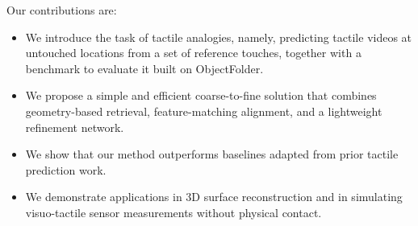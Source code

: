\vspace{0.5em}
\noindent Our contributions are:
\begin{itemize}
  \setlength{\itemsep}{0pt}
  \item We introduce the task of tactile analogies, namely, predicting tactile videos at
        untouched locations from a set of reference touches, together with a benchmark to evaluate it
        built on ObjectFolder.
  \item We propose a simple and efficient coarse-to-fine solution that combines geometry-based
        retrieval, feature-matching alignment, and a lightweight refinement network.
  \item We show that our method outperforms baselines adapted from prior tactile prediction work.
  \item We demonstrate applications in 3D surface reconstruction and in simulating visuo-tactile
        sensor measurements without physical contact.
\end{itemize}
